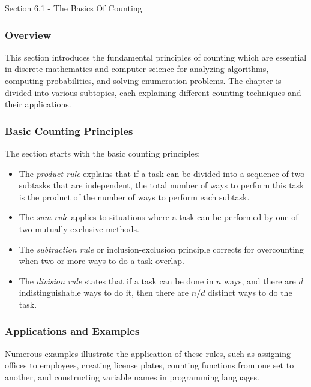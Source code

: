 \begin{notes}{Section 6.1 - The Basics Of Counting}
    \subsubsection*{Overview}

    This section introduces the fundamental principles of counting which are essential in discrete mathematics and computer science for analyzing algorithms, computing probabilities, and solving 
    enumeration problems. The chapter is divided into various subtopics, each explaining different counting techniques and their applications. \vspace*{1em}
    
    \subsubsection*{Basic Counting Principles}
    The section starts with the basic counting principles:
    \begin{itemize}
        \item The \textit{product rule} explains that if a task can be divided into a sequence of two subtasks that are independent, the total number of ways to perform this task is the product of 
        the number of ways to perform each subtask.
        \item The \textit{sum rule} applies to situations where a task can be performed by one of two mutually exclusive methods.
        \item The \textit{subtraction rule} or inclusion-exclusion principle corrects for overcounting when two or more ways to do a task overlap.
        \item The \textit{division rule} states that if a task can be done in $ n $ ways, and there are $ d $ indistinguishable ways to do it, then there are $ n/d $ distinct ways to do the task.
    \end{itemize}
    
    \subsubsection*{Applications and Examples}
    Numerous examples illustrate the application of these rules, such as assigning offices to employees, creating license plates, counting functions from one set to another, and constructing variable 
    names in programming languages.
    

\end{notes}
